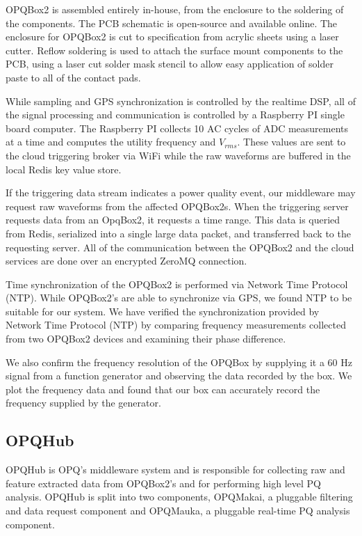 \documentclass[a4paper, conference]{IEEEtran}
\begin{document}
OPQBox2 is assembled entirely in-house, from the enclosure to the soldering of the components. The PCB schematic is open-source and available online. The enclosure for OPQBox2 is cut to specification from acrylic sheets using a laser cutter. Reflow soldering is used to attach the surface mount components to the PCB, using a laser cut solder mask stencil to allow easy application of solder paste to all of the contact pads. 

While sampling and GPS synchronization is controlled by the realtime DSP, all of the signal processing and communication is controlled by a Raspberry PI single board computer. The Raspberry PI collects 10 AC cycles of ADC measurements at a time and computes the utility frequency and $V_{rms}$. These values are sent to the cloud triggering broker via WiFi while the raw waveforms are buffered in the local Redis key value store.


If the triggering data stream indicates a power quality event, our middleware may request raw waveforms from the affected OPQBox2s. When the triggering server requests data from an OpqBox2, it requests a time range. This data is queried from Redis, serialized into a single large data packet, and transferred back to the requesting server. All of the communication between the OPQBox2 and the cloud services are done over an encrypted ZeroMQ connection\cite{fengping2012distributed}.

Time synchronization of the OPQBox2 is performed via Network Time Protocol (NTP)\cite{mills1991internet}. While OPQBox2's are able to synchronize via GPS, we found NTP to be suitable for our system. We have verified the synchronization provided by Network Time Protocol (NTP) by comparing frequency measurements collected from two OPQBox2 devices and examining their phase difference.

We also confirm the frequency resolution of the OPQBox by supplying it a 60 Hz signal from a function generator and observing the data recorded by the box. We plot the frequency data and found that our box can accurately record the frequency supplied by the generator.

\subsection{OPQHub}
OPQHub is OPQ's middleware system and is responsible for collecting raw and feature extracted data from OPQBox2's and for performing high level PQ analysis.  OPQHub is split into two components, OPQMakai, a pluggable filtering and data request component and OPQMauka, a pluggable real-time PQ analysis component.
\end{document}
